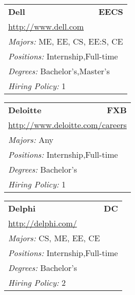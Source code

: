 \documentclass[twoside]{article}
\begin{document}
\begin{center}
\begin{multicols}{3}
\begin{FlushLeft}
\begin{minipage}{\columnwidth}
\end{minipage}
 
\begin{minipage}{\columnwidth}\begin{tabularx}{.95\columnwidth}{Xr}
                 {\Large\bf Dell} & {\Large\bf EECS}\\
    \multicolumn{2}{p{.95\columnwidth}}{\url{http://www.dell.com}}\\
    \multicolumn{2}{p{.95\columnwidth}}{\emph{Majors:} ME, EE, CS, EE:S, CE}\\
    \multicolumn{2}{p{.95\columnwidth}}{\emph{Positions:} Internship,Full-time}\\
    \multicolumn{2}{p{.95\columnwidth}}{\emph{Degrees:} Bachelor's,Master's}\\
    \multicolumn{2}{p{.95\columnwidth}}{\emph{Hiring Policy:} 1}\\
    \end{tabularx}
    
\end{minipage}
 
\begin{minipage}{\columnwidth}\begin{tabularx}{.95\columnwidth}{Xr}
                 {\Large\bf Deloitte} & {\Large\bf FXB}\\
    \multicolumn{2}{p{.95\columnwidth}}{\url{http://www.deloitte.com/careers}}\\
    \multicolumn{2}{p{.95\columnwidth}}{\emph{Majors:} Any}\\
    \multicolumn{2}{p{.95\columnwidth}}{\emph{Positions:} Internship,Full-time}\\
    \multicolumn{2}{p{.95\columnwidth}}{\emph{Degrees:} Bachelor's}\\
    \multicolumn{2}{p{.95\columnwidth}}{\emph{Hiring Policy:} 1}\\
    \end{tabularx}
    
\end{minipage}
 
\begin{minipage}{\columnwidth}\begin{tabularx}{.95\columnwidth}{Xr}
                 {\Large\bf Delphi} & {\Large\bf DC}\\
    \multicolumn{2}{p{.95\columnwidth}}{\url{http://delphi.com/}}\\
    \multicolumn{2}{p{.95\columnwidth}}{\emph{Majors:} CS, ME, EE, CE}\\
    \multicolumn{2}{p{.95\columnwidth}}{\emph{Positions:} Internship,Full-time}\\
    \multicolumn{2}{p{.95\columnwidth}}{\emph{Degrees:} Bachelor's}\\
    \multicolumn{2}{p{.95\columnwidth}}{\emph{Hiring Policy:} 2}\\
    \end{tabularx}
    

\end{minipage}
\end{FlushLeft}
\end{multicols}
\end{center}
\end{document}
